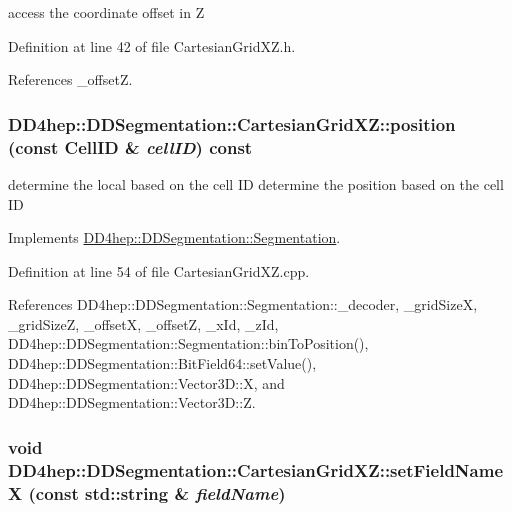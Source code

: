 access the coordinate offset in Z 

Definition at line 42 of file CartesianGridXZ.h.

References \_\-offsetZ.\hypertarget{class_d_d4hep_1_1_d_d_segmentation_1_1_cartesian_grid_x_z_a44fb20b19214cb7a56e1d17e3edf3c5f}{
\subsubsection[{position}]{ DD4hep::DDSegmentation::CartesianGridXZ::position (const {\bf CellID} \& {\em cellID}) const}}
\label{class_d_d4hep_1_1_d_d_segmentation_1_1_cartesian_grid_x_z_a44fb20b19214cb7a56e1d17e3edf3c5f}


determine the local based on the cell ID determine the position based on the cell ID 

Implements \hyperlink{class_d_d4hep_1_1_d_d_segmentation_1_1_segmentation_a594fe6d78667415855858d083b64acad}{DD4hep::DDSegmentation::Segmentation}.

Definition at line 54 of file CartesianGridXZ.cpp.

References DD4hep::DDSegmentation::Segmentation::\_\-decoder, \_\-gridSizeX, \_\-gridSizeZ, \_\-offsetX, \_\-offsetZ, \_\-xId, \_\-zId, DD4hep::DDSegmentation::Segmentation::binToPosition(), DD4hep::DDSegmentation::BitField64::setValue(), DD4hep::DDSegmentation::Vector3D::X, and DD4hep::DDSegmentation::Vector3D::Z.\hypertarget{class_d_d4hep_1_1_d_d_segmentation_1_1_cartesian_grid_x_z_a2d1d365c962d662e90e53f07980bee2c}{
\subsubsection[{setFieldNameX}]{\setlength{\rightskip}{0pt plus 5cm}void DD4hep::DDSegmentation::CartesianGridXZ::setFieldNameX (const std::string \& {\em fieldName})}}
\label{class_d_d4hep_1_1_d_d_segmentation_1_1_cartesian_grid_x_z_a2d1d365c962d662e90e53f07980bee2c}


